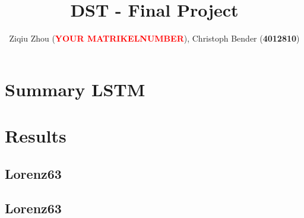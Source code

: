 \documentclass{scrarticle}
\title{DST - Final Project}
\author{Ziqiu Zhou (\textbf{\textcolor{red}{YOUR MATRIKELNUMBER}}), Christoph Bender (\textbf{4012810})}
\begin{document}
	\maketitle
	\clearpage
	\section{Summary LSTM}
	
	\section{Results}
	\subsection{Lorenz63}
	\subsection{Lorenz63}
\end{document}
